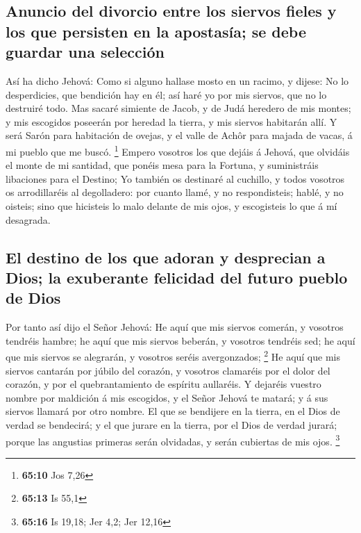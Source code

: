 \hypertarget{anuncio-del-divorcio-entre-los-siervos-fieles-y-los-que-persisten-en-la-apostasuxeda-se-debe-guardar-una-selecciuxf3n}{%
\subsection{Anuncio del divorcio entre los siervos fieles y los que
persisten en la apostasía; se debe guardar una
selección}\label{anuncio-del-divorcio-entre-los-siervos-fieles-y-los-que-persisten-en-la-apostasuxeda-se-debe-guardar-una-selecciuxf3n}}

 Así ha dicho Jehová: Como si alguno hallase mosto en un
racimo, y dijese: No lo desperdicies, que bendición hay en él; así haré
yo por mis siervos, que no lo destruiré todo.  Mas sacaré
simiente de Jacob, y de Judá heredero de mis montes; y mis escogidos
poseerán por heredad la tierra, y mis siervos habitarán allí.
 Y será Sarón para habitación de ovejas, y el valle de
Achôr para majada de vacas, á mi pueblo que me buscó. \footnote{\textbf{65:10}
  Jos 7,26}  Empero vosotros los que dejáis á Jehová, que
olvidáis el monte de mi santidad, que ponéis mesa para la Fortuna, y
suministráis libaciones para el Destino;  Yo también os
destinaré al cuchillo, y todos vosotros os arrodillaréis al degolladero:
por cuanto llamé, y no respondisteis; hablé, y no oisteis; sino que
hicisteis lo malo delante de mis ojos, y escogisteis lo que á mí
desagrada.

\hypertarget{el-destino-de-los-que-adoran-y-desprecian-a-dios-la-exuberante-felicidad-del-futuro-pueblo-de-dios}{%
\subsection{El destino de los que adoran y desprecian a Dios; la
exuberante felicidad del futuro pueblo de
Dios}\label{el-destino-de-los-que-adoran-y-desprecian-a-dios-la-exuberante-felicidad-del-futuro-pueblo-de-dios}}

 Por tanto así dijo el Señor Jehová: He aquí que mis
siervos comerán, y vosotros tendréis hambre; he aquí que mis siervos
beberán, y vosotros tendréis sed; he aquí que mis siervos se alegrarán,
y vosotros seréis avergonzados; \footnote{\textbf{65:13} Is 55,1}
 He aquí que mis siervos cantarán por júbilo del corazón,
y vosotros clamaréis por el dolor del corazón, y por el quebrantamiento
de espíritu aullaréis.  Y dejaréis vuestro nombre por
maldición á mis escogidos, y el Señor Jehová te matará; y á sus siervos
llamará por otro nombre.  El que se bendijere en la
tierra, en el Dios de verdad se bendecirá; y el que jurare en la tierra,
por el Dios de verdad jurará; porque las angustias primeras serán
olvidadas, y serán cubiertas de mis ojos. \footnote{\textbf{65:16} Is
  19,18; Jer 4,2; Jer 12,16}

